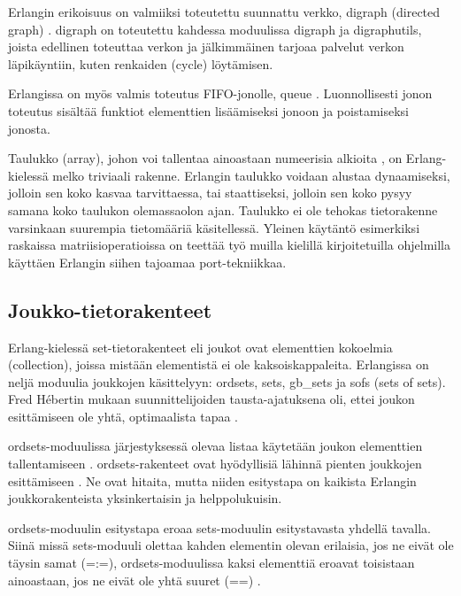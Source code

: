 \documentclass[11pt,oneside,a4paper]{article}
\begin{document}
Erlangin erikoisuus on valmiiksi toteutettu suunnattu verkko, digraph
(directed graph) \cite{HEB13}. digraph on toteutettu kahdessa moduulissa digraph
ja digraph\textunderscore utils, joista edellinen toteuttaa verkon ja
jälkimmäinen tarjoaa palvelut verkon läpikäyntiin, kuten renkaiden (cycle) löytämisen.
 
Erlangissa on myös valmis toteutus FIFO-jonolle, queue \cite{HEB13}.
Luonnollisesti jonon toteutus sisältää funktiot elementtien lisäämiseksi
jonoon ja poistamiseksi jonosta. 
 
Taulukko (array), johon voi tallentaa
ainoastaan numeerisia alkioita \cite{HEB13}, on Erlang-kielessä melko triviaali rakenne. Erlangin taulukko voidaan alustaa
dynaamiseksi, jolloin sen koko kasvaa tarvittaessa,
tai staattiseksi, jolloin sen koko pysyy samana koko taulukon olemassaolon ajan. Taulukko
ei ole tehokas tietorakenne varsinkaan suurempia tietomääriä käsitellessä. Yleinen
käytäntö esimerkiksi raskaissa matriisioperatioissa on teettää työ muilla
kielillä kirjoitetuilla ohjelmilla käyttäen Erlangin siihen tajoamaa port-tekniikkaa.

\subsection{Joukko-tietorakenteet}

Erlang-kielessä set-tietorakenteet eli joukot ovat elementtien kokoelmia
(collection), joissa mistään elementistä ei ole kaksoiskappaleita. Erlangissa on
neljä moduulia joukkojen käsittelyyn: ordsets, sets, gb\_sets ja sofs (sets of
sets). Fred Hébertin mukaan suunnittelijoiden tausta-ajatuksena oli, ettei
joukon esittämiseen ole yhtä, optimaalista tapaa \cite{HEB13}.

ordsets-moduulissa järjestyksessä olevaa listaa käytetään joukon elementtien
tallentamiseen \cite{ERL13}. ordsets-rakenteet ovat hyödyllisiä lähinnä pienten
joukkojen esittämiseen \cite{HEB13}. Ne ovat hitaita, mutta niiden esitystapa
on kaikista Erlangin joukkorakenteista yksinkertaisin ja helppolukuisin. 



ordsets-moduulin esitystapa eroaa sets-moduulin esitystavasta yhdellä tavalla.
Siinä missä sets-moduuli olettaa kahden elementin olevan erilaisia, jos ne eivät
ole täysin samat (=:=), ordsets-moduulissa kaksi elementtiä eroavat toisistaan
ainoastaan, jos ne eivät ole yhtä suuret (==) \cite{ERL13}.
\end{document}
